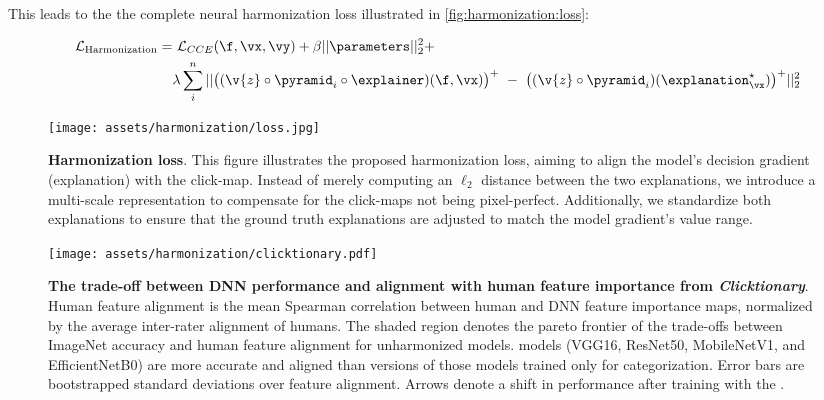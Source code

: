 This leads to the the complete neural harmonization loss illustrated in \autoref{fig:harmonization:loss}:

\begin{align}
    \mathcal{L}_{\text{Harmonization}} =&
    ~\mathcal{L}_{CCE}(\f, \vx, \vy) + \beta ||\parameters||_2^2 + \\
    &\lambda \sum_{i}^n || \big( (\v{z} \circ \pyramid_i \circ \explainer)(\f, \vx) \big)^+ ~ - ~ \big( (\v{z} \circ \pyramid_i)(\explanation^\star_{\vx}) \big)^+ ||_2^2 
\end{align}

\begin{figure}[t]
  \centering
    \texttt{[image: assets/harmonization/loss.jpg]}
  \caption{\textbf{Harmonization loss}. This figure illustrates the proposed harmonization loss, aiming to align the model's decision gradient (explanation) with the click-map. Instead of merely computing an $\ell_2$ distance between the two explanations, we introduce a multi-scale representation to compensate for the click-maps not being pixel-perfect. Additionally, we standardize both explanations to ensure that the ground truth explanations are adjusted to match the model gradient's value range.}\label{fig:harmonization:loss}
\end{figure}


\begin{figure}[ht]
\begin{center}
   \texttt{[image: assets/harmonization/clicktionary.pdf]}
\end{center}
   \caption{\textbf{The trade-off between DNN performance and alignment with human feature importance from \textit{Clicktionary}\cite{Linsley2017-qe}}. Human feature alignment is the mean Spearman correlation between human and DNN feature importance maps, normalized by the average inter-rater alignment of humans. The shaded region denotes the pareto frontier of the trade-offs between ImageNet accuracy and human feature alignment for unharmonized models.  {\color{meta}{Harmonized}} models (VGG16, ResNet50, MobileNetV1, and EfficientNetB0) are more accurate and aligned than versions of those models trained only for categorization. Error bars are bootstrapped standard deviations over feature alignment. Arrows denote a shift in performance after training with the {\color{meta}{neural harmonizer}}.}
\label{fig:harmonization:clicktionary_results}
\end{figure}

